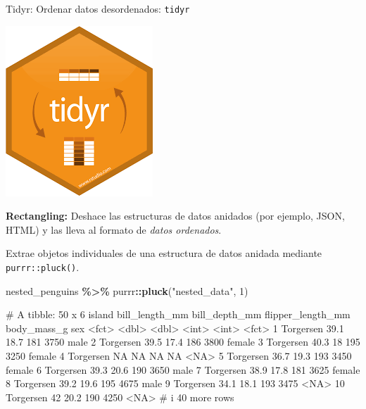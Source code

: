 \documentclass[
  ignorenonframetext,
  aspectratio=169]{beamer}
\newenvironment{Shaded}{\begin{snugshade}}{\end{snugshade}}
\newcommand{\DecValTok}[1]{\textcolor[rgb]{0.00,0.00,0.81}{#1}}
\newcommand{\FunctionTok}[1]{\textcolor[rgb]{0.13,0.29,0.53}{\textbf{#1}}}
\newcommand{\NormalTok}[1]{#1}
\newcommand{\SpecialCharTok}[1]{\textcolor[rgb]{0.81,0.36,0.00}{\textbf{#1}}}
\newcommand{\StringTok}[1]{\textcolor[rgb]{0.31,0.60,0.02}{#1}}
\let\oldverbatim\verbatim
\let\endoldverbatim\endverbatim
\renewenvironment{verbatim}{\tiny\oldverbatim}{\endoldverbatim}
\begin{document}
\begin{frame}[fragile]{Tidyr: Ordenar datos desordenados:
\texttt{tidyr}}
\label{tidyr-ordenar-datos-desordenados-tidyr-6}
\begin{flushright}\includegraphics[width=0.05\linewidth]{Imgs/logo_tidyr} \end{flushright}

\textbf{Rectangling:} Deshace las estructuras de datos anidados (por
ejemplo, JSON, HTML) y las lleva al formato de \emph{datos ordenados}.

Extrae objetos individuales de una estructura de datos anidada mediante
\texttt{purrr::pluck()}.

\begin{Shaded}
\begin{Highlighting}[]
\NormalTok{nested\_penguins }\SpecialCharTok{\%\textgreater{}\%}\NormalTok{ purrr}\SpecialCharTok{::}\FunctionTok{pluck}\NormalTok{(}\StringTok{"nested\_data"}\NormalTok{, }\DecValTok{1}\NormalTok{)}
\end{Highlighting}
\end{Shaded}

\begin{verbatim}
# A tibble: 50 x 6
   island    bill_length_mm bill_depth_mm flipper_length_mm body_mass_g sex   
   <fct>              <dbl>         <dbl>             <int>       <int> <fct> 
 1 Torgersen           39.1          18.7               181        3750 male  
 2 Torgersen           39.5          17.4               186        3800 female
 3 Torgersen           40.3          18                 195        3250 female
 4 Torgersen           NA            NA                  NA          NA <NA>  
 5 Torgersen           36.7          19.3               193        3450 female
 6 Torgersen           39.3          20.6               190        3650 male  
 7 Torgersen           38.9          17.8               181        3625 female
 8 Torgersen           39.2          19.6               195        4675 male  
 9 Torgersen           34.1          18.1               193        3475 <NA>  
10 Torgersen           42            20.2               190        4250 <NA>  
# i 40 more rows
\end{verbatim}
\end{frame}
\end{document}

